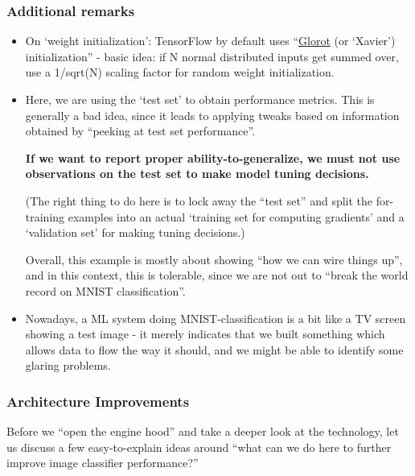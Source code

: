 \documentclass[11pt]{article}
\begin{document}
\hypertarget{additional-remarks}{%
\subsubsection{Additional remarks}\label{additional-remarks}}

\begin{itemize}
\item
  On `weight initialization': TensorFlow by default uses
  ``\href{https://proceedings.mlr.press/v9/glorot10a/glorot10a.pdf}{Glorot} \cite{glorot2010understanding}
  (or `Xavier') initialization'' - basic idea: if N normal distributed
  inputs get summed over, use a 1/sqrt(N) scaling factor for random
  weight initialization.
\item
  Here, we are using the `test set' to obtain performance metrics. This
  is generally a bad idea, since it leads to applying tweaks based on
  information obtained by ``peeking at test set performance''.

  \textbf{If we want to report proper ability-to-generalize, we must not
  use observations on the test set to make model tuning decisions.}

  (The right thing to do here is to lock away the ``test set'' and split
  the for-training examples into an actual `training set for computing
  gradients' and a `validation set' for making tuning decisions.)

  Overall, this example is mostly about showing ``how we can wire things
  up'', and in this context, this is tolerable, since we are not out to
  ``break the world record on MNIST classification''.
\item
  Nowadays, a ML system doing MNIST-classification is a bit like a TV
  screen showing a test image - it merely indicates that we built
  something which allows data to flow the way it should, and we might be
  able to identify some glaring problems.
\end{itemize}

    \hypertarget{architecture-improvements}{%
\subsubsection{Architecture
Improvements}\label{architecture-improvements}}

Before we ``open the engine hood'' and take a deeper look at the
technology, let us discuss a few easy-to-explain ideas around ``what can
we do here to further improve image classifier performance?''
\end{document}
